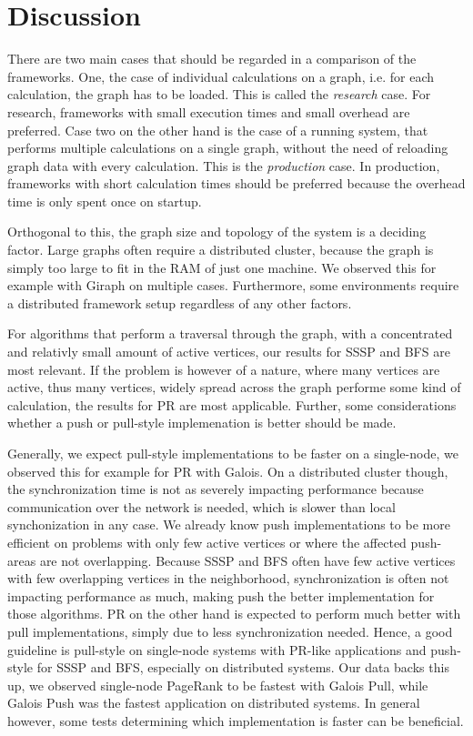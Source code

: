 
\section{Discussion}

There are two main cases that should be regarded in a comparison of the frameworks. One, the case of individual calculations on a graph, i.e. for each calculation, the graph has to be loaded. This is called the \emph{research} case. For research, frameworks with small execution times and small overhead are preferred. Case two on the other hand is the case of a running system, that performs multiple calculations on a single graph, without the need of reloading graph data with every calculation. This is the \emph{production} case.
In production, frameworks with short calculation times should be preferred because the overhead time is only spent once on startup.

Orthogonal to this, the graph size and topology of the system is a deciding factor. Large graphs often require a distributed cluster, because the graph is simply too large to fit in the RAM of just one machine. We observed this for example with Giraph on multiple cases.
Furthermore, some environments require a distributed framework setup regardless of any other factors.

For algorithms that perform a traversal through the graph, with a concentrated and relativly small amount of active vertices, our results for SSSP and BFS are most relevant.
If the problem is however of a nature, where many vertices are active, thus many vertices, widely spread across the graph performe some kind of calculation, the results for PR are most applicable.
Further, some considerations whether a push or pull-style implemenation is better should be made.

Generally, we expect pull-style implementations to be faster on a single-node, we observed this for example for PR with Galois.
On a distributed cluster though, the synchronization time is not as severely impacting performance because communication over the network is needed, which is slower than local synchonization in any case.
We already know push implementations to be more efficient on problems with only few active vertices or where the affected push-areas are not overlapping. 
Because SSSP and BFS often have few active vertices with few overlapping vertices in the neighborhood, synchronization is often not impacting performance as much, making push the better implementation for those algorithms.
PR on the other hand is expected to perform much better with pull implementations, simply due to less synchronization needed.
Hence, a good guideline is pull-style on single-node systems with PR-like applications and push-style for SSSP and BFS, especially on distributed systems. 
Our data backs this up, we observed single-node PageRank to be fastest with Galois Pull, while Galois Push was the fastest application on distributed systems.
In general however, some tests determining which implementation is faster can be beneficial.

